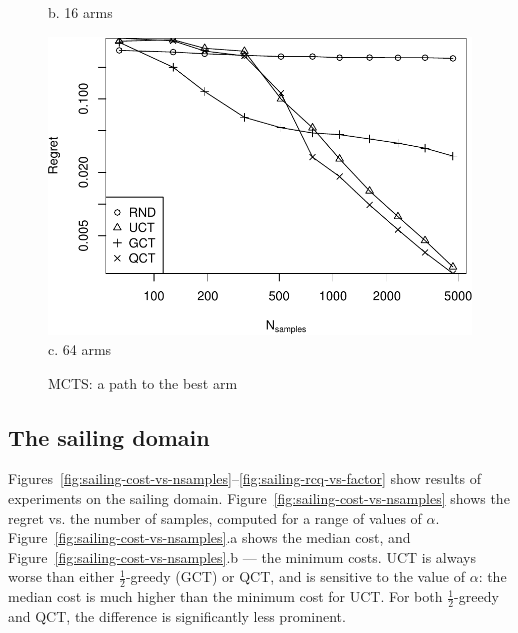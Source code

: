 \documentclass[letterpaper]{article}
\begin{document}
\begin{figure}[h!]
\begin{minipage}[c]{1.0\linewidth}
    b. 16 arms
    \vspace{1em}
  \end{minipage}
  \begin{minipage}[c]{1.0\linewidth}
    \centering
    \includegraphics[scale=0.4]{tree-identity-k=64-uqb=8.pdf} \\
    c. 64 arms
  \end{minipage}
  \label{fig:mcts-regret}
  \caption{MCTS: a path to the best arm}
\end{figure}

\subsection{The sailing domain}
\label{sec:emp-sailing}

Figures~\ref{fig:sailing-cost-vs-nsamples}--\ref{fig:sailing-rcq-vs-factor}
show results of experiments on the sailing
domain. Figure~\ref{fig:sailing-cost-vs-nsamples} shows the regret
vs. the number of samples, computed for a range of values of
$\alpha$. Figure~\ref{fig:sailing-cost-vs-nsamples}.a shows the median
cost, and Figure~\ref{fig:sailing-cost-vs-nsamples}.b --- the minimum
costs. UCT is always worse than either $\frac 1 2$-greedy (GCT) or
QCT, and is sensitive to the value of $\alpha$: the median cost is
much higher than the minimum cost for UCT. For both $\frac 1 2$-greedy
and QCT, the difference is significantly less prominent.
\end{document}

